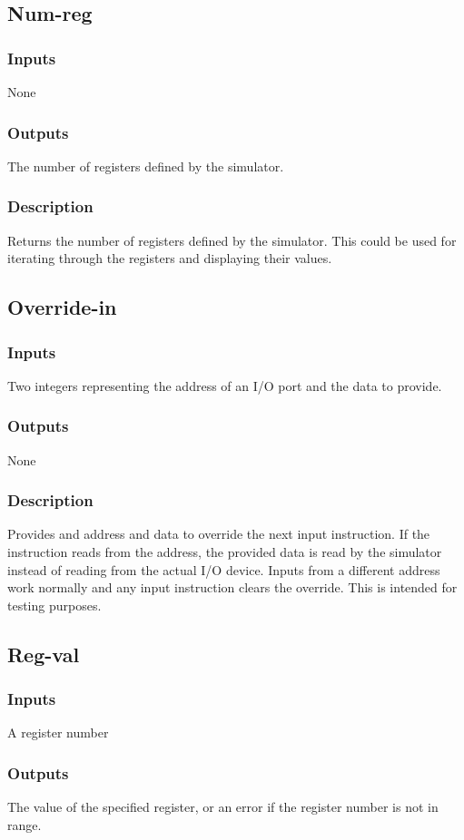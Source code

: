 \documentclass[10pt, openany]{book}
\begin{document}
\subsection{Num-reg}
\subsubsection{Inputs}
None
\subsubsection{Outputs}
The number of registers defined by the simulator.
\subsubsection{Description}
Returns the number of registers defined by the simulator.  This could be used for iterating through the registers and displaying their values.

\subsection{Override-in}
\subsubsection{Inputs}
Two integers representing the address of an I/O port and the data to provide.
\subsubsection{Outputs}
None
\subsubsection{Description}
Provides and address and data to override the next input instruction.  If the instruction reads from the address, the provided data is read by the simulator instead of reading from the actual I/O device.  Inputs from a different address work normally and any input instruction clears the override.  This is intended for testing purposes.

\subsection{Reg-val}
\subsubsection{Inputs}
A register number
\subsubsection{Outputs}
The value of the specified register, or an error if the register number is not in range.
\end{document}
